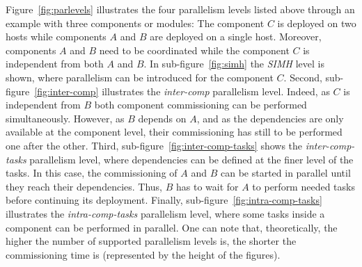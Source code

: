 Figure~\ref{fig:parlevels} illustrates the four parallelism levels listed above through an example with three components or modules: The component $C$ is deployed on two hosts while components $A$ and $B$ are deployed on a single host. Moreover, components $A$ and $B$ need to be coordinated while the component $C$ is independent from both $A$ and $B$. In sub-figure~\ref{fig:simh} the \emph{SIMH} level is shown, where parallelism can be introduced for the component $C$. Second, sub-figure~\ref{fig:inter-comp} illustrates the \emph{inter-comp} parallelism level. Indeed, as $C$ is independent from $B$ both component commissioning can be performed simultaneously. However, as $B$ depends on $A$, and as the dependencies are only available at the component level, their commissioning has still to be performed one after the other. Third, sub-figure~\ref{fig:inter-comp-tasks} shows the \emph{inter-comp-tasks} parallelism level, where dependencies can be defined at the finer level of the tasks. In this case, the commissioning of $A$ and $B$ can be started in parallel until they reach their dependencies. Thus, $B$ has to wait for $A$ to perform needed tasks before continuing its deployment. Finally, sub-figure~\ref{fig:intra-comp-tasks} illustrates the \emph{intra-comp-tasks} parallelism level, where some tasks inside a component can be performed in parallel. One can note that, theoretically, the higher the number of supported parallelism levels is, the shorter the commissioning time is (represented by the height of the figures).


